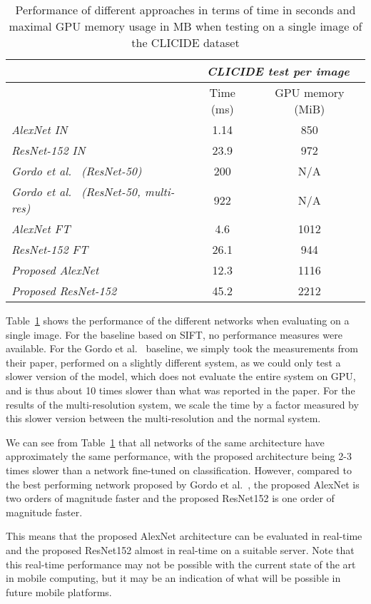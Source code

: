 \begin{table}
\centering
\begin{tabular}{|l|c|c|}
\hline & \multicolumn{2}{c|}{\emph{CLICIDE test per image}}\\
\hline & Time (ms) & GPU memory (MiB)\\
\hline \emph{AlexNet IN} & 1.14 & 850\\
\hline \emph{ResNet-152 IN} & 23.9 & 972\\
\hline \emph{Gordo et al.~\cite{gordo_deep_2016} (ResNet-50)} & 200 & N/A\\
\hline \emph{Gordo et al.~\cite{gordo_deep_2016} (ResNet-50, multi-res)}
& 922 & N/A\\
\hline \emph{AlexNet FT} & 4.6 & 1012\\
\hline \emph{ResNet-152 FT} & 26.1 & 944\\
\hline \emph{Proposed AlexNet} & 12.3 & 1116\\
\hline \emph{Proposed ResNet-152} & 45.2 & 2212\\
\hline
\end{tabular}
\caption{Performance of different approaches in terms of time in seconds and
maximal GPU memory usage in MB when testing on a single image
of the CLICIDE dataset\label{tab:perftest}}
\end{table}

Table~\ref{tab:perftest} shows the performance of the different networks
when evaluating on a single image. For the baseline based on SIFT, no performance measures were available.
For the Gordo et al.~\cite{gordo_deep_2016} baseline, we simply took the
measurements from their paper, performed on a slightly different system,
as we could only test a slower version of the model, which does not
evaluate the entire system on GPU, and is thus about 10 times slower than
what was reported in the paper.
For the results of the multi-resolution system, we scale the time
by a factor measured by this slower version between the multi-resolution
and the normal system.

We can see from Table~\ref{tab:perftest} that all networks
of the same architecture have approximately the same performance, with
the proposed architecture being 2-3 times slower than a network
fine-tuned on classification. However, compared to the best performing
network proposed by Gordo et al.~\cite{gordo_deep_2016}, the proposed AlexNet
is two orders of magnitude faster and the proposed ResNet152 is one
order of magnitude faster.

This means that the proposed AlexNet architecture can be evaluated in
real-time and the proposed ResNet152 almost in real-time on a suitable
server.
Note that this real-time performance may not be possible with the current
state of the art in mobile computing, but it may be an indication of
what will be possible in future mobile platforms.

